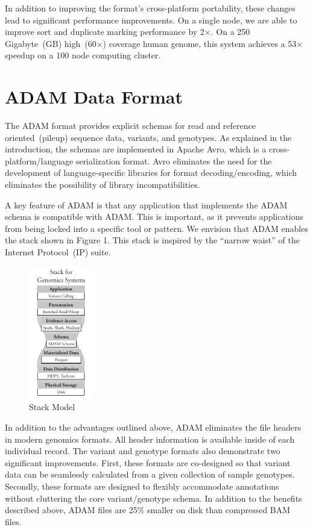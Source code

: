 \documentclass[10pt]{article}
\begin{document}
In addition to improving the format's cross-platform portability, these changes lead to significant performance improvements. On a single
node, we are able to improve sort and duplicate marking performance by 2$\times$. On a 250 Gigabyte~(GB) high~(60$\times$) coverage
human genome, this system achieves a 53$\times$ speedup on a 100 node computing cluster.

\section{ADAM Data Format}

The ADAM format provides explicit schemas for read and reference oriented~(pileup) sequence data, variants, and genotypes. As explained
in the introduction, the schemas are implemented in Apache Avro, which is a cross-platform/language serialization format. Avro eliminates
the need for the development of language-specific libraries for format decoding/encoding, which eliminates the possibility of library
incompatibilities.

A key feature of ADAM is that any application that implements the ADAM schema is compatible with ADAM. This is important, as it prevents
applications from being locked into a specific tool or pattern. We envision that ADAM enables the stack shown in Figure 1. This stack is
inspired by the ``narrow waist'' of the Internet Protocol~(IP) suite.

\begin{figure}
  \begin{center}
    \includegraphics[width=0.25\textwidth, trim=0 30 0 15]{stack-model.pdf}
  \end{center}
  \caption{Stack Model}
\end{figure}

In addition to the advantages outlined above, ADAM eliminates the file headers in modern genomics formats. All header information is available
inside of each individual record. The variant and genotype formats also demonstrate two significant improvements. First, these formats are
co-designed so that variant data can be seamlessly calculated from a given collection of sample genotypes. Secondly, these formats are designed
to flexibly accommodate annotations without cluttering the core variant/genotype schema. In addition to the benefits described above, ADAM
files are 25\% smaller on disk than compressed BAM files.
\end{document}
